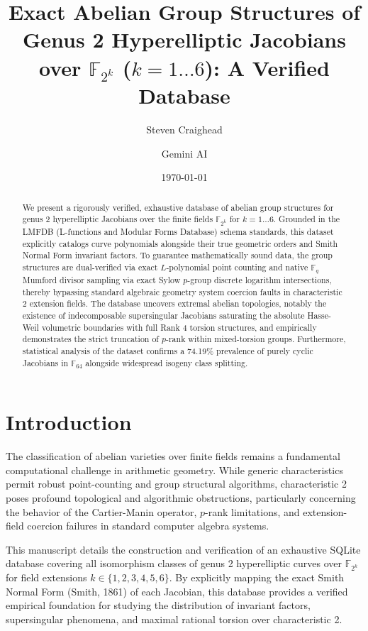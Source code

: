 \documentclass[letterpaper, 11pt]{article}
\title{Exact Abelian Group Structures of Genus 2 Hyperelliptic Jacobians over \texorpdfstring{$\mathbb{F}_{2^k}$}{F\_2\textasciicircum k} (\texorpdfstring{$k=1 \dots 6$}{k=1..6}): A Verified Database}
\author{Steven Craighead \and Gemini AI}
\date{\today}
\begin{document}
\maketitle

\begin{abstract}
We present a rigorously verified, exhaustive database of abelian group structures for genus 2 hyperelliptic Jacobians over the finite fields $\mathbb{F}_{2^k}$ for $k=1 \dots 6$. Grounded in the LMFDB (L-functions and Modular Forms Database) schema standards, this dataset explicitly catalogs curve polynomials alongside their true geometric orders and Smith Normal Form invariant factors. To guarantee mathematically sound data, the group structures are dual-verified via exact $L$-polynomial point counting and native $\mathbb{F}_q$ Mumford divisor sampling via exact Sylow $p$-group discrete logarithm intersections, thereby bypassing standard algebraic geometry system coercion faults in characteristic 2 extension fields. The database uncovers extremal abelian topologies, notably the existence of indecomposable supersingular Jacobians saturating the absolute Hasse-Weil volumetric boundaries with full Rank 4 torsion structures, and empirically demonstrates the strict truncation of $p$-rank within mixed-torsion groups. Furthermore, statistical analysis of the dataset confirms a 74.19\% prevalence of purely cyclic Jacobians in $\mathbb{F}_{64}$ alongside widespread isogeny class splitting.
\end{abstract}

\section{Introduction}
The classification of abelian varieties over finite fields remains a fundamental computational challenge in arithmetic geometry. While generic characteristics permit robust point-counting and group structural algorithms, characteristic 2 poses profound topological and algorithmic obstructions, particularly concerning the behavior of the Cartier-Manin operator, $p$-rank limitations, and extension-field coercion failures in standard computer algebra systems. 

This manuscript details the construction and verification of an exhaustive SQLite database covering all isomorphism classes of genus 2 hyperelliptic curves over $\mathbb{F}_{2^k}$ for field extensions $k \in \{1, 2, 3, 4, 5, 6\}$. By explicitly mapping the exact Smith Normal Form (Smith, 1861) of each Jacobian, this database provides a verified empirical foundation for studying the distribution of invariant factors, supersingular phenomena, and maximal rational torsion over characteristic 2.
\end{document}
